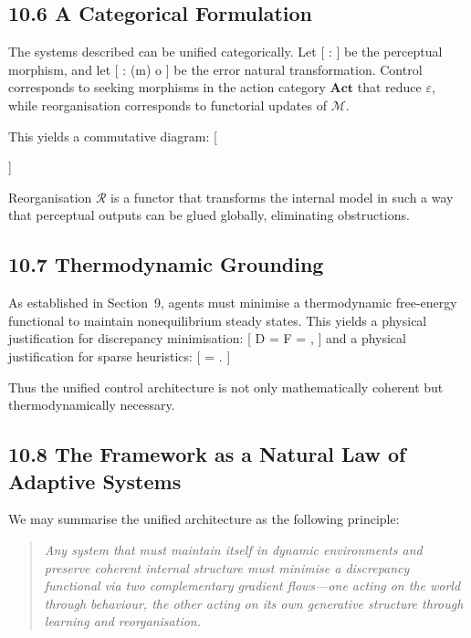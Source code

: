 \documentclass[11pt,a4paper,twoside]{article}
\begin{document}
\subsection{10.6 A Categorical Formulation}

The systems described can be unified categorically. Let
[
 :  \to {}
]
be the perceptual morphism, and let
[
\varepsilon : (m) \Rightarrow o
]
be the error natural transformation. Control corresponds to seeking morphisms in the action category $\mathbf{Act}$ that reduce $\varepsilon$, while reorganisation corresponds to functorial updates of $\mathcal{M}$.

This yields a commutative diagram:
[
]

Reorganisation $\mathcal{R}$ is a functor that transforms the internal model in such a way that perceptual outputs can be glued globally, eliminating obstructions.

\subsection{10.7 Thermodynamic Grounding}

As established in Section~9, agents must minimise a thermodynamic free-energy functional to maintain nonequilibrium steady states. This yields a physical justification for discrepancy minimisation:
[
D = F = ,
]
and a physical justification for sparse heuristics:
[
 = .
]

Thus the unified control architecture is not only mathematically coherent but thermodynamically necessary.

\subsection{10.8 The Framework as a Natural Law of Adaptive Systems}

We may summarise the unified architecture as the following principle:

\begin{quote}
\emph{Any system that must maintain itself in dynamic environments and preserve coherent internal structure must minimise a discrepancy functional via two complementary gradient flows---one acting on the world through behaviour, the other acting on its own generative structure through learning and reorganisation.}
\end{quote}
\end{document}
